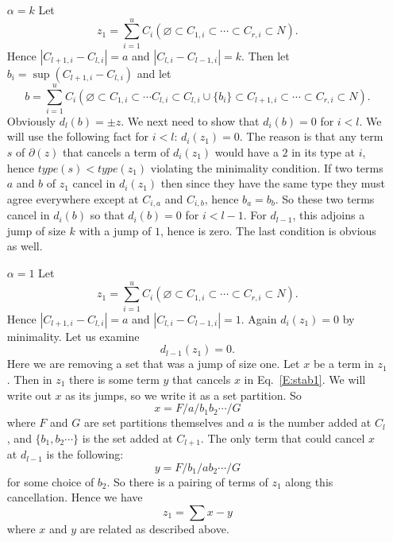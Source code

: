 \documentclass{elsart}
\begin{document}
\begin{pf}
\begin{enumerate}
     \item[$\alpha=k$]
        Let $$z_1 = \sum_{i=1}^u C_i (\varnothing \subset C_{1,i} \subset \cdots \subset C_{r,i} \subset 
        N).$$ Hence  
        $|C_{l+1, i} - C_{l, i}| = a$ and $|C_{l, i} - C_{l-1, i}| = k$.  Then let 
        $b_i = \sup(C_{l+1,i}-C_{l, i})$ and let $$b = \sum_{i=1}^u C_i (\varnothing \subset C_{1,i} \subset \cdots C_{l,i} 
        \subset C_{l,i} \cup \{b_i\} \subset C_{l+1, i} \subset \cdots \subset C_{r,i} \subset 
        N).$$ Obviously $d_l(b) = \pm z$. We next need to show that $d_i(b)=0$
        for $i < l$. We will use the following fact for $i< l$: $d_i(z_1)=0.$ The reason is that any term $s$ of $\partial(z)$ 
        that cancels a term of $d_i(z_1)$ would have a $2$ in its type at $i$, hence $type(s) < 
        type(z_1)$ violating the minimality condition. If two terms $a$ and $b$ of $z_1$ cancel in $d_i(z_1)$ then since they have 
        the same type they must agree everywhere except at $C_{i, a}$ and $C_{i, b}$, hence $b_a=b_b$. So these two terms cancel in $d_i(b)$
        so that $d_i(b)=0$ for $i < l-1$. For $d_{l-1}$, this adjoins a jump of size $k$ with a jump of $1$, hence is zero.
        The last condition is obvious as well.
     \item[$\alpha=1$] Let $$z_1 = \sum_{i=1}^u C_i (\varnothing \subset C_{1,i} \subset \cdots \subset C_{r,i} \subset 
        N).$$  Hence  
        $|C_{l+1, i} - C_{l, i}| = a$ and $|C_{l, i} - C_{l-1, i}| = 1$. 
        Again $d_i(z_1)=0$ by minimality. Let us examine 
        \begin{equation} \label{E:stab1}
          d_{l-1}(z_1) = 0.
        \end{equation}
        Here we are removing a set that was a jump of size one. Let $x$ be a term in $z_1$. Then in $z_1$ there is some term $y$ that 
        cancels $x$ in Eq.~\ref{E:stab1}. We will write out $x$ as its jumps, so we write it as a set partition. So 
        $$x= F/a/b_1b_2 \cdots /G$$ where $F$ and $G$ are set partitions themselves and $a$ is the number added at $C_l$, and 
        $\{b_1,b_2 \cdots \}$ is the set added at $C_{l+1}$. The only term that could cancel $x$ at $d_{l-1}$ is the following:
        $$y= F/b_1/ab_2 \cdots/G$$ for some choice of $b_2$. So there is a pairing of terms of $z_1$ along this cancellation. Hence we 
        have
        \begin{equation} \label{E:stab2}
          z_1 = \sum x - y
        \end{equation}
        where $x$ and $y$ are related as described above.  


\end{enumerate}
\end{pf}
\end{document}
